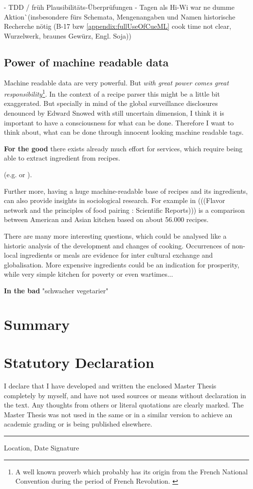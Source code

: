 \documentclass[12pt, twoside]{report}
\begin{document}
- TDD / früh Plausibilitäts-Überprüfungen - Tagen als Hi-Wi war ne dumme Aktion^^ (insbesondere fürs Schemata, Mengenangaben und Namen historische Recherche nötig (B-17 bzw \cref{appendix:fullUseOfCueML} cook time not clear,	Wurzelwerk, braunes Gewürz,	Engl. Soja))


\section{Power of machine readable data}
Machine readable data are very powerful. But \textit{with great power comes great responsibility}\footnote{A well known proverb which probably has its origin from the French National Convention during the period of French Revolution. \parencite{quoteInvestigator}}. In the context of a recipe parser this might be a little bit exaggerated. But specially in mind of the global surveillance disclosures denounced by Edward Snowed with still uncertain dimension, I think it is important to have a consciousness for what can be done. Therefore I want to think about, what can be done through innocent looking machine readable tags. 
\bigskip

\textbf{For the good} there exists already much effort for services, which require being able to extract ingredient from recipes.

 (e.g. \cite{ingredientNetworks} or \cite{recipeRecommendation}).

Further more, having a huge machine-readable base of recipes and its ingredients, can also provide insights in sociological research. For example in (((Flavor network and the principles of food pairing : Scientific Reports))) is a comparison between American and Asian kitchen based on about 56.000 recipes.

There are many more interesting questions, which could be analysed like a historic analysis of the development and changes of cooking. Occurrences of non-local ingredients or meals are evidence for inter cultural exchange and globalisation. More expensive ingredients could be an indication for prosperity, while very simple kitchen for poverty or even wartimes...
\bigskip

\textbf{In the bad} \parencite{clintonHealth} "schwacher vegetarier"


\chapter{Summary}


\appendix
\chapter{Statutory Declaration}
I declare that I have developed and written the enclosed Master Thesis completely by myself, and have not used sources or means without declaration in the text. Any thoughts from others or literal quotations are clearly marked. The Master Thesis was not used in the same or in a similar version to achieve an academic grading or is being published elsewhere.
\newline
\newline
\newline
\rule{\textwidth}{1pt}
Location, Date \hfill Signature 
\end{document}
